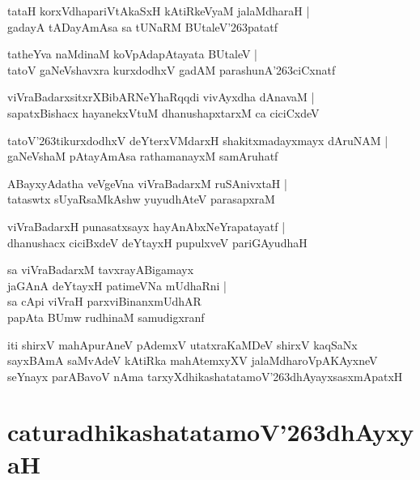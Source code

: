 \documentclass[twoside,12pt,openright]{book}
\def\S{\char'263}
\newcounter{shloka}[chapter]
\begin{document}
\begin{shloka}%
tataH korxVdhapariVtAkaSxH kAtiRkeVyaM jalaMdharaH |\\
gadayA tADayAmAsa sa tUNaRM BUtaleV\S patatf
\end{shloka}

\begin{shloka}%
tatheYva naMdinaM koVpAdapAtayata BUtaleV |\\
tatoV gaNeVshavxra kurxdodhxV gadAM parashunA\S ciCxnatf 
\end{shloka}

\begin{shloka}%
viVraBadarxsitxrXBibARNeYhaRqqdi vivAyxdha dAnavaM |\\
sapatxBishacx hayanekxVtuM dhanushapxtarxM ca ciciCxdeV 
\end{shloka}

\begin{shloka}%
tatoV\S tikurxdodhxV deYterxVMdarxH shakitxmadayxmayx dAruNAM |\\
gaNeVshaM pAtayAmAsa rathamanayxM samAruhatf
\end{shloka}

\begin{shloka}%
ABayxyAdatha veVgeVna viVraBadarxM ruSAnivxtaH |\\
tataswtx sUyaRsaMkAshw yuyudhAteV parasapxraM 
\end{shloka}

\begin{shloka}%
viVraBadarxH punasatxsayx hayAnAbxNeYrapatayatf |\\
dhanushacx ciciBxdeV deYtayxH pupulxveV pariGAyudhaH 
\end{shloka}

\begin{shloka}%
sa viVraBadarxM tavxrayABigamayx \\
jaGAnA deYtayxH patimeVNa mUdhaRni |\\
sa cApi viVraH parxviBinanxmUdhAR \\
papAta BUmw rudhinaM samudigxranf
\end{shloka}

\begin{center}
iti shirxV mahApurAneV pAdemxV utatxraKaMDeV shirxV kaqSaNx sayxBAmA saMvAdeV kAtiRka mahAtemxyXV 
jalaMdharoVpAKAyxneV seYnayx parABavoV nAma tarxyXdhikashatatamoV\S dhAyayxsasxmApatxH 
\end{center}

\chapter{caturadhikashatatamoV\S dhAyxyaH}
\end{document}
